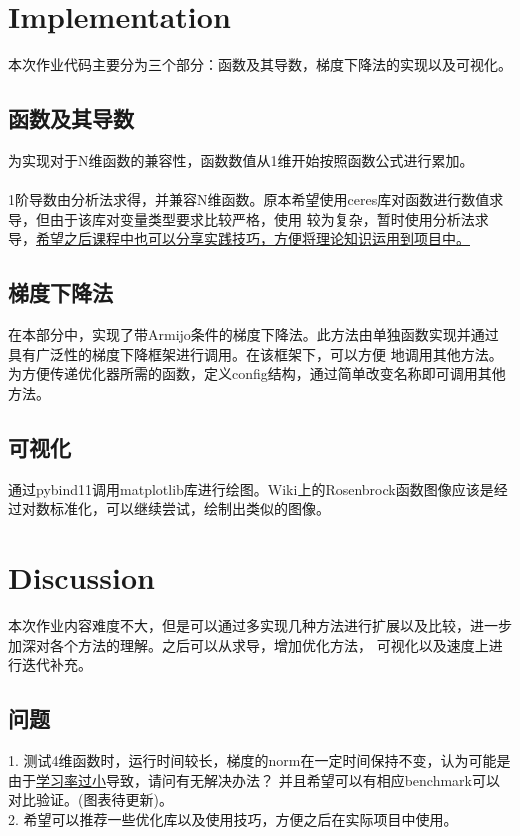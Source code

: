 \documentclass[letterpaper]{article}
\begin{document}
\section{Implementation}
\begin{CJK*}{UTF8}{gbsn}
本次作业代码主要分为三个部分：函数及其导数，梯度下降法的实现以及可视化。
\subsection{函数及其导数}
为实现对于N维函数的兼容性，函数数值从1维开始按照函数公式进行累加。
\\\\
\noindent1阶导数由分析法求得，并兼容N维函数。原本希望使用ceres库对函数进行数值求导，但由于该库对变量类型要求比较严格，使用
较为复杂，暂时使用分析法求导，\underline{希望之后课程中也可以分享实践技巧，方便将理论知识运用到项目中。}

\subsection{梯度下降法}
在本部分中，实现了带Armijo条件的梯度下降法。此方法由单独函数实现并通过具有广泛性的梯度下降框架进行调用。在该框架下，可以方便
地调用其他方法。为方便传递优化器所需的函数，定义config结构，通过简单改变名称即可调用其他方法。

\subsection{可视化}
通过pybind11调用matplotlib库进行绘图。Wiki上的Rosenbrock函数图像应该是经过对数标准化，可以继续尝试，绘制出类似的图像。
\end{CJK*}
\section{Discussion}
\begin{CJK*}{UTF8}{gbsn}
本次作业内容难度不大，但是可以通过多实现几种方法进行扩展以及比较，进一步加深对各个方法的理解。之后可以从求导，增加优化方法，
可视化以及速度上进行迭代补充。

\subsection{问题}
1. 测试4维函数时，运行时间较长，梯度的norm在一定时间保持不变，认为可能是由于\underline{学习率过小}导致，请问有无解决办法？
并且希望可以有相应benchmark可以对比验证。(图表待更新)。
\\
2. 希望可以推荐一些优化库以及使用技巧，方便之后在实际项目中使用。
\end{CJK*}
\end{document}
